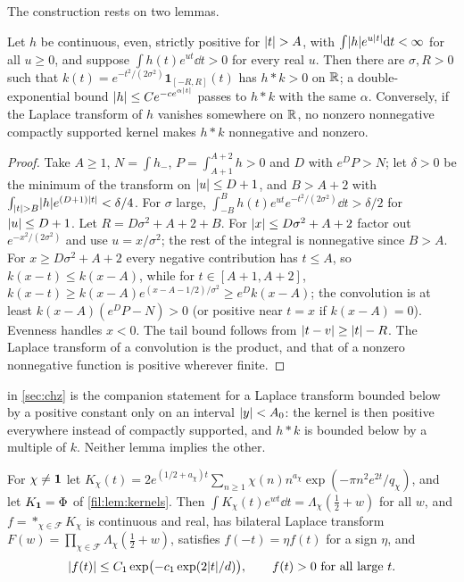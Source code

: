 The construction rests on two lemmas.

\begin{lemma}\label{fil:lem:smooth}
Let $h$ be continuous, even, strictly positive for $\lvert t\rvert>A$, with $\int\lvert h\rvert e^{u\lvert t\rvert}\mathrm{d} t<\infty$ for all
$u\ge0$, and suppose $\int h(t)e^{ut}\dd t>0$ for every real $u$. Then there are $\sigma,R>0$ such that
$k(t)=e^{-t^2/(2\sigma^2)}\mathbf1_{[-R,R]}(t)$ has $h*k>0$ on $\mathbb{R}$; a double-exponential bound
$\lvert h\rvert\le Ce^{-ce^{\alpha\lvert t\rvert}}$ passes to $h*k$ with the same $\alpha$. Conversely, if the Laplace transform of $h$
vanishes somewhere on $\mathbb{R}$, no nonzero nonnegative compactly supported kernel makes $h*k$ nonnegative and nonzero.
\end{lemma}

\begin{proof}
Take $A\ge1$, $N=\int h_-$, $P=\int_{A+1}^{A+2}h>0$ and $D$ with $e^DP>N$; let $\delta>0$ be the minimum of the
transform on $\lvert u\rvert\le D+1$, and $B>A+2$ with $\int_{\lvert t\rvert>B}\lvert h\rvert e^{(D+1)\lvert t\rvert}<\delta/4$. For $\sigma$ large,
$\int_{-B}^Bh(t)e^{ut}e^{-t^2/(2\sigma^2)}\dd t>\delta/2$ for $\lvert u\rvert\le D+1$. Let $R=D\sigma^2+A+2+B$. For
$\lvert x\rvert\le D\sigma^2+A+2$ factor out $e^{-x^2/(2\sigma^2)}$ and use $u=x/\sigma^2$; the rest of the integral is
nonnegative since $B>A$. For $x\ge D\sigma^2+A+2$ every negative contribution has $t\le A$, so
$k(x-t)\le k(x-A)$, while for $t\in[A+1,A+2]$, $k(x-t)\ge k(x-A)e^{(x-A-1/2)/\sigma^2}\ge e^Dk(x-A)$; the
convolution is at least $k(x-A)(e^DP-N)>0$ (or positive near $t=x$ if $k(x-A)=0$). Evenness handles $x<0$.
The tail bound follows from $\lvert t-v\rvert\ge\lvert t\rvert-R$. The Laplace transform of a convolution is the product, and
that of a nonzero nonnegative function is positive wherever finite.
\end{proof}

 in \cref{sec:chz} is the companion statement for a Laplace transform bounded below by a
positive constant only on an interval $\lvert y\rvert<A_0$: the kernel is then positive everywhere instead of compactly supported, and $h*k$ is
bounded below by a multiple of $k$. Neither lemma implies the other.

\begin{lemma}\label{fil:lem:tails}
For $\chi\ne\mathbf{1}$ let $K_\chi(t)=2e^{(1/2+a_\chi)t}\sum_{n\ge1}\chi(n)n^{a_\chi}\exp(-\pi n^2e^{2t}/q_\chi)$, and let
$K_{\mathbf{1}}=\Phi$ of \cref{fil:lem:kernels}. Then $\int K_\chi(t)e^{wt}\dd t=\Lambda_\chi(\tfrac12+w)$ for all $w$, and
$f=\mathop{\ast}_{\chi\in\mathcal F}K_\chi$ is continuous and real, has bilateral Laplace transform
$F(w)=\prod_{\chi\in\mathcal F}\Lambda_\chi(\tfrac12+w)$, satisfies $f(-t)=\eta f(t)$ for a sign $\eta$, and
\[
 \lvert f(t)\rvert\le C_1\exp\bigl(-c_1\exp(2\lvert t\rvert/d)\bigr),\qquad f(t)>0\ \text{for all large }t.
\]
\end{lemma}

